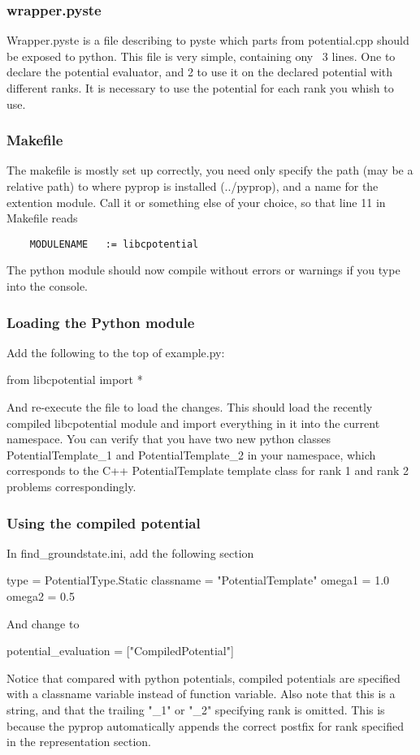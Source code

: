 \subsubsection*{wrapper.pyste}
Wrapper.pyste is a file describing to pyste which parts from potential.cpp should be exposed to python. This file is very
simple, containing ony ~3 lines. One to declare the potential evaluator, and 2 to use it on the declared potential with
different ranks. It is necessary to use the potential for each rank you whish to use. 

\subsubsection*{Makefile}
The makefile is mostly set up correctly, you need only specify the path (may be a relative path) to where pyprop 
is installed (../pyprop), and a name for the extention module. Call it  or something else of your
choice, so that line 11 in Makefile reads
\begin{verbatim}
	MODULENAME   := libcpotential
\end{verbatim}

The python module should now compile without errors or warnings if you type  into the console.

\subsubsection*{Loading the Python module}
Add the following to the top of example.py:
\begin{python}
	from libcpotential import *
\end{python}
And re-execute the file to load the changes. 
This should load the recently compiled libcpotential module and import everything in it into the current namespace.
You can verify that you have two new python classes PotentialTemplate\_1 and PotentialTemplate\_2 in your namespace, which 
corresponds to the C++ PotentialTemplate template class for rank 1 and rank 2 problems correspondingly.

\subsubsection*{Using the compiled potential}
In find\_groundstate.ini, add the following section
\begin{python}
	[CompiledPotential]
	type = PotentialType.Static
	classname = "PotentialTemplate"
	omega1 = 1.0
	omega2 = 0.5
\end{python}
And change  to 
\begin{python}
	potential_evaluation = ["CompiledPotential"]
\end{python}
Notice that compared with python potentials, compiled potentials are specified with a classname variable instead of function
variable. Also note that this is a string, and that the trailing "\_1" or "\_2" specifying rank is omitted. This is because
the pyprop automatically appends the correct postfix for rank specified in the representation section.

